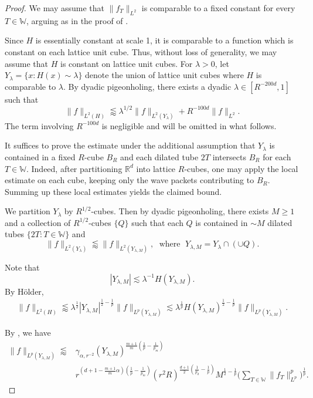 \documentclass[10pt,a4paper]{amsart}
\newcommand{\W}{\mathbb{W}}
\newcommand{\la}{\lambda}
\newcommand{\less}{\lessapprox}
\newcommand{\les}{\lesssim}
\begin{document}
\begin{proof}
We may assume that $\| f_T \|_{L^2}$ is comparable to a fixed constant for every $T\in \W$, arguing as in the proof of .

Since $H$ is essentially constant at scale 1, it is comparable to a function which is constant on each lattice unit cube. Thus, without loss of generality, we may assume that $H$ is constant on lattice unit cubes. For $\la>0$, let $Y_\lambda = \{ x: H(x) \sim \lambda\}$ denote the union of lattice unit cubes where $H$ is comparable to $\la$. By dyadic pigeonholing, there exists  a dyadic $\lambda \in [R^{-200d}, 1]$ such that 
    \[ \| f\|_{L^2(H)} \less \lambda^{1/2} \| f\|_{L^2(Y_\la)} + R^{-100d} \| f\|_{L^2}. \]
    The term involving $R^{-100d}$ is negligible and will be omitted in what follows.
    
 
It suffices to prove the estimate under the additional assumption that
$Y_\lambda$ is contained in a fixed $R$-cube $B_R$ and each dilated tube $2T$ intersects $B_R$ for each $T\in \W$. Indeed, after partitioning
$\mathbb R^d$ into lattice $R$-cubes, one may apply the local estimate on each
cube, keeping only the wave packets contributing to $B_R$. Summing up these local estimates yields the claimed bound. 

We partition $Y_\la$ by $R^{1/2}$-cubes. Then by dyadic pigeonholing, there exists $M\geq 1$ and a collection of $R^{1/2}$-cubes $\{ Q\}$ such that each $Q$ is contained  in $\sim M$ dilated tubes $\{ 2T: T\in \W\}$ and 
  \[ \| f\|_{L^2(Y_\la)} \less \| f\|_{L^2(Y_{\la,M})}, \; \text{ where } \; Y_{\la,M} = Y_\la \cap (\cup Q). \]

 Note that 
\[ |Y_{\la,M}| \les \la^{-1} H(Y_{\la,M}).\]
  By H\"older,
  \begin{align*}
  	\| f\|_{L^2(H)} \less \lambda^{\frac{1}{2}} |Y_{\la,M}|^{\frac{1}{2}-\frac{1}{p}} \| f\|_{L^p(Y_{\la,M})}  \les \la^{\frac{1}{p}} H(Y_{\la,M})^{\frac{1}{2}-\frac{1}{p}} \| f\|_{L^p(Y_{\la,M})} .
  \end{align*}

 
By , we have 
\begin{align*}
	\| f\|_{L^p(Y_{\la,M})}  \less  &\gamma_{\alpha,r^{-2}}(Y_{\la,M})^{\frac{m+1}{m}(\frac{1}{p}-\frac{1}{p_m})}  \\ &r^{(d+1 - \frac{m+1}{m}\alpha)(\frac{1}{p}-\frac{1}{p_m})} (r^2 R)^{\frac{d+1}{2}(\frac{1}{p_d} -\frac{1}{p})}   M^{\frac{1}{2}-\frac{1}{p}}   \bigg( \sum_{T\in \W} \| f_T \|_{L^p}^p \bigg)^{\frac{1}{p}}.
\end{align*}


\end{proof}
\end{document}
